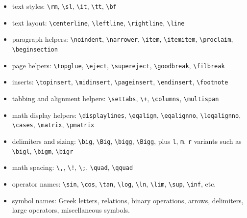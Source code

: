 \documentclass[11pt]{article}
\newcommand{\tightlist}{}
\begin{document}
\begin{itemize}
\tightlist
\item
  text styles: \texttt{\textbackslash{}rm}, \texttt{\textbackslash{}sl}, \texttt{\textbackslash{}it}, \texttt{\textbackslash{}tt}, \texttt{\textbackslash{}bf}
\item
  text layout: \texttt{\textbackslash{}centerline}, \texttt{\textbackslash{}leftline}, \texttt{\textbackslash{}rightline}, \texttt{\textbackslash{}line}
\item
  paragraph helpers: \texttt{\textbackslash{}noindent}, \texttt{\textbackslash{}narrower}, \texttt{\textbackslash{}item}, \texttt{\textbackslash{}itemitem}, \texttt{\textbackslash{}proclaim}, \texttt{\textbackslash{}beginsection}
\item
  page helpers: \texttt{\textbackslash{}topglue}, \texttt{\textbackslash{}eject}, \texttt{\textbackslash{}supereject}, \texttt{\textbackslash{}goodbreak}, \texttt{\textbackslash{}filbreak}
\item
  inserts: \texttt{\textbackslash{}topinsert}, \texttt{\textbackslash{}midinsert}, \texttt{\textbackslash{}pageinsert}, \texttt{\textbackslash{}endinsert}, \texttt{\textbackslash{}footnote}
\item
  tabbing and alignment helpers: \texttt{\textbackslash{}settabs}, \texttt{\textbackslash{}+}, \texttt{\textbackslash{}columns}, \texttt{\textbackslash{}multispan}
\item
  math display helpers: \texttt{\textbackslash{}displaylines}, \texttt{\textbackslash{}eqalign}, \texttt{\textbackslash{}eqalignno}, \texttt{\textbackslash{}leqalignno}, \texttt{\textbackslash{}cases}, \texttt{\textbackslash{}matrix}, \texttt{\textbackslash{}pmatrix}
\item
  delimiters and sizing: \texttt{\textbackslash{}big}, \texttt{\textbackslash{}Big}, \texttt{\textbackslash{}bigg}, \texttt{\textbackslash{}Bigg}, plus \texttt{l}, \texttt{m}, \texttt{r} variants such as \texttt{\textbackslash{}bigl}, \texttt{\textbackslash{}bigm}, \texttt{\textbackslash{}bigr}
\item
  math spacing: \texttt{\textbackslash{},}, \texttt{\textbackslash!}, \texttt{\textbackslash{};}, \texttt{\textbackslash{}quad}, \texttt{\textbackslash{}qquad}
\item
  operator names: \texttt{\textbackslash{}sin}, \texttt{\textbackslash{}cos}, \texttt{\textbackslash{}tan}, \texttt{\textbackslash{}log}, \texttt{\textbackslash{}ln}, \texttt{\textbackslash{}lim}, \texttt{\textbackslash{}sup}, \texttt{\textbackslash{}inf}, etc.
\item
  symbol names: Greek letters, relations, binary operations, arrows, delimiters, large operators, miscellaneous symbols.
\end{itemize}
\end{document}
